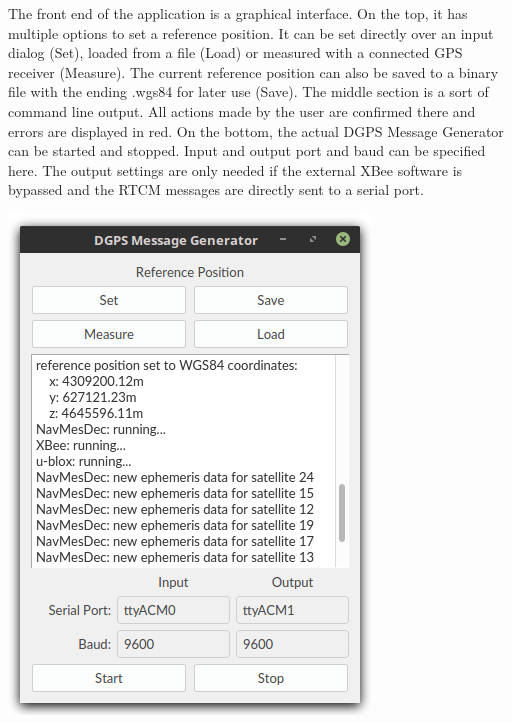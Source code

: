 \begin{minipage}{0.5\textwidth}
 The front end of the application is a graphical interface.
 On the top, it has multiple options to set a reference position.
 It can be set directly over an input dialog (Set), loaded from a file (Load) or measured with a connected GPS receiver (Measure).
 The current reference position can also be saved to a binary file with the ending .wgs84 for later use (Save).
 The middle section is a sort of command line output.
 All actions made by the user are confirmed there and errors are displayed in red.
 On the bottom, the actual DGPS Message Generator can be started and stopped.
 Input and output port and baud can be specified here.
 The output settings are only needed if the external XBee software is bypassed and the RTCM messages are directly sent to a serial port.
\end{minipage}
\hfill
\begin{minipage}{0.45\textwidth}
 \centering
 \includegraphics[width=\textwidth]{images/GUI.png}
 \label{fig:gui}
\end{minipage}

